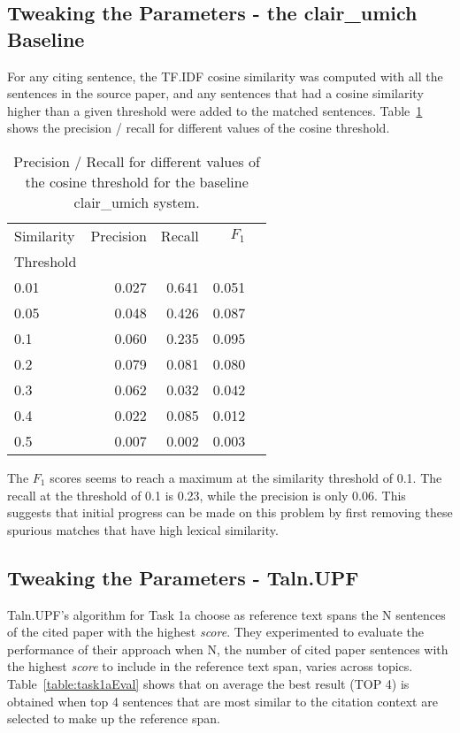\documentclass[11pt]{article}
\begin{document}
\subsection{Tweaking the Parameters - the clair\_umich Baseline}
For any citing sentence, the TF.IDF cosine similarity was computed with all the sentences in the source paper, and any sentences that had a cosine similarity higher than a given threshold were added to the matched sentences. Table~\ref{tab:clairumichbaseline} shows the precision / recall for different values of the cosine threshold.
\begin{table}[h]
  \centering
  \begin{tabular}{|l|r|r|r|r|}
  	\hline
	Similarity & Precision & Recall & $F_1$ \\
	Threshold & & & \\
	\hline
	0.01 & 0.027 & 0.641 & 0.051\\
	0.05 & 0.048 & 0.426 & 0.087\\
	0.1 & 0.060 & 0.235 & 0.095\\
	0.2 & 0.079 & 0.081 & 0.080\\
	0.3 & 0.062 & 0.032 & 0.042\\
	0.4 & 0.022 & 0.085 & 0.012\\
	0.5 & 0.007 &  0.002 & 0.003\\
	\hline
  \end{tabular}
  \caption{Precision / Recall for different values of the cosine threshold 
  			for the baseline clair\_umich system.}
  \label{tab:clairumichbaseline}
\end{table}

The $F_1$ scores seems to reach a maximum at the similarity threshold of 0.1. The recall at the threshold of 0.1 is 0.23, while the precision is only 0.06. This suggests that initial progress can be made on this problem by first removing these spurious matches that have high lexical similarity.

\subsection{Tweaking the Parameters - Taln.UPF}
Taln.UPF's algorithm for Task 1a choose as reference text spans the N sentences 
of the cited paper with the highest \textit{score}. They experimented to evaluate 
the performance of their approach when N, the number of cited paper sentences 
with the highest \textit{score} to include in the reference text span, varies across 
topics. Table~\ref{table:task1aEval} shows that on  average the best result (TOP 4) 
is obtained when top 4 sentences that are most similar to the citation context 
are selected to make up the reference  span.
\end{document}
